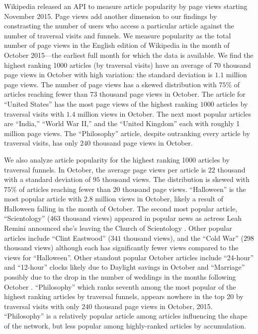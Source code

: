 \documentclass[pre,twocolumn,twoside,superscriptaddress,floatfix]{revtex4-1}
\begin{document}
{Wikipedia released an API to measure article popularity by page views
starting November 2015. 
Page views add another dimension to our
findings by constrasting
the number of users who access a particular article against
the number of traversal visits and funnels.
We measure popularity as the total number 
of page views in the English edition of Wikipedia in the month of 
October 2015---the earliest full month for which the data is available. 
We find the highest ranking 1000 articles (by traversal visits) have an average of
$70$ thousand page views in October with high variation: the standard deviation 
is $1.1$ million page views. 
The number of page views has a skewed distribution with $75\%$ of articles
reaching fewer than $73$ thousand page views in October.
The article for ``United States'' has the most page 
views of the highest ranking $1000$ articles by traversal visits with 
$1.4$ million views in October. The next most popular articles are 
``India,'' ``World War II,'' and the ``United Kingdom'' each with roughly 1 million page views. 
The ``Philosophy'' article, despite outranking every article by traversal visits,
has only $240$ thousand page views in October.

We also analyze article popularity for the highest ranking 1000 articles by 
traversal funnels. In October, the average page views per article is 
$22$ thousand with a standard deviation of $95$ thousand views. The distribution
is skewed with $75\%$ of articles reaching fewer than $20$ thousand page views. 
``Halloween'' is the most popular article with $2.8$ million views in October,
likely a result of Halloween falling in the month of October. 
The second most popular article, ``Scientology'' ($463$ thousand views) appeared in popular news as actress Leah Remini announced she's leaving the Church of Scientology 
\cite{scientology}.
Other popular articles include ``Clint Eastwood'' ($341$ thousand views),
and the ``Cold War'' ($298$ thousand views) although each has significantly fewer views compared to the views for ``Halloween''.
Other standout popular October articles include ``24-hour'' and ``12-hour'' clocks likely due
to Daylight savings in October and ``Marriage'' possibly due to the drop in the number of
weddings in the months following October
\cite{weddings}.
``Philosophy'' which ranks seventh among the most popular of the highest ranking articles by traversal funnels, appears nowhere in the top 20
by traversal visits with only $240$ thousand page views in October, 2015. ``Philosophy'' is a relatively popular article 
among articles influencing the shape of the network, but less popular among 
highly-ranked articles by accumulation.

}
\end{document}
